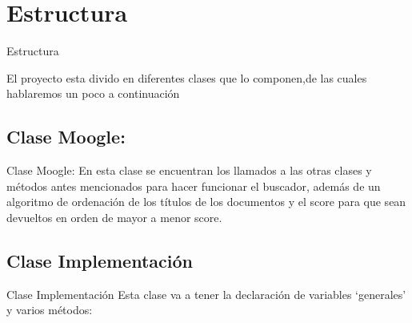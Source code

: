 \documentclass[19pt]{beamer}
\begin{document}
  \section{Estructura}

      \begin{frame}{Estructura}
      	\begin{center}
      	 El proyecto esta divido en diferentes clases que lo componen,de las cuales hablaremos un poco a continuación
      	\end{center}
      \end{frame}
      
      
       \subsection{Clase Moogle:}
      
      \begin{frame}{Clase Moogle:}
      	En esta clase se encuentran los llamados a las otras clases y métodos antes mencionados para hacer funcionar el buscador, además de un algoritmo de ordenación de los títulos de los documentos y el score para que sean devueltos en orden de mayor a menor score.\\
      \end{frame}
      
      
     \subsection{Clase Implementación}
     
       \begin{frame}{Clase Implementación}
       		Esta clase va a tener la declaración de variables ‘generales’ y varios métodos:
       \end{frame}
       
\end{document}
